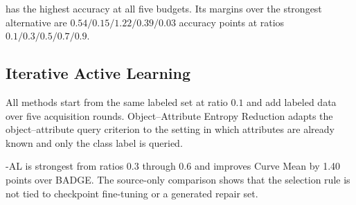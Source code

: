 \model has the highest accuracy at all five budgets. Its margins over the strongest alternative are $0.54/0.15/1.22/0.39/0.03$ accuracy points at ratios $0.1/0.3/0.5/0.7/0.9$.

\subsection{Iterative Active Learning}

All methods start from the same labeled set at ratio $0.1$ and add labeled data over five acquisition rounds. Object--Attribute Entropy Reduction adapts the object--attribute query criterion to the setting in which attributes are already known and only the class label is queried.

\begin{table}[h]
\centering
\caption{ImageNet10 source-only iterative active learning. Metric: five-seed mean test accuracy (\%); Curve Mean averages ratios $0.1$--$0.6$.}
\label{tab:source-only-active-learning}
\small
\setlength{\tabcolsep}{3pt}
\end{table}

\modelplain-AL is strongest from ratios $0.3$ through $0.6$ and improves Curve Mean by 1.40 points over BADGE. The source-only comparison shows that the selection rule is not tied to checkpoint fine-tuning or a generated repair set.

